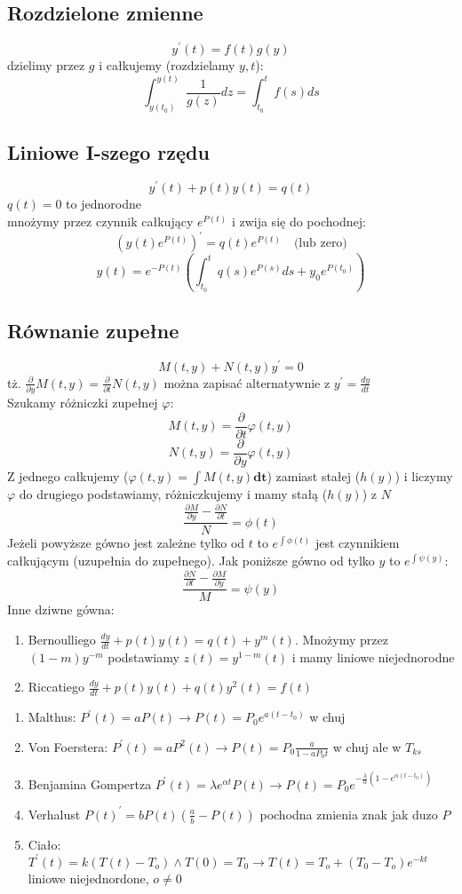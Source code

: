 \documentclass{article}
\begin{document}
\subsection*{Rozdzielone zmienne}
$$
y^\prime(t) = f(t)g(y)
$$
dzielimy przez $g$ i całkujemy (rozdzielamy $y,t$):
$$
\int_{y(t_0)}^{y(t)}\frac{1}{g(z)}dz = \int_{t_0}^t f(s)ds
$$
\subsection*{Liniowe I-szego rzędu}
$$
y^\prime(t) + p(t)y(t) = q(t)
$$
$q(t) = 0$ to jednorodne\\
mnożymy przez czynnik całkujący $e^{P(t)}$ i zwija się do pochodnej:
$$
\left( y(t)e^{P(t)}\right)^\prime = q(t)e^{P(t)} \quad \text{(lub zero)}
$$
$$
y(t) = e^{-P(t)} \left (\int_{t_0}^t q(s)e^{P(s)}ds + y_0e^{P(t_0)}\right)
$$
\subsection*{Równanie zupełne}
$$
M(t,y) + N(t,y)y^\prime = 0
$$
tż. $\frac{\partial}{\partial y}M(t,y) = \frac{\partial}{\partial t} N(t,y)$ można zapisać alternatywnie z $y^\prime = \frac{dy}{dt}$\\
Szukamy różniczki zupełnej $\varphi$:
$$M(t,y) = \frac{\partial}{\partial t} \varphi(t,y)$$
$$N(t,y) = \frac{\partial}{\partial y} \varphi(t,y)$$
Z jednego całkujemy ($\varphi(t,y) = \int M(t,y)\textbf{dt}$) zamiast stałej ($h(y)$) i liczymy $\varphi$ do drugiego podstawiamy, różniczkujemy i mamy stałą  ($h(y)$) z $N$
$$\frac{\frac{\partial M}{\partial y} - \frac{\partial N}{\partial t}}{N} = \phi(t)$$
Jeżeli powyższe gówno jest zależne tylko od $t$ to $e^{\int \phi(t)}$ jest czynnikiem całkującym (uzupełnia do zupełnego). Jak poniższe gówno od tylko $y$ to $e^{\int \psi(y)}$:
$$\frac{\frac{\partial N}{\partial t} - \frac{\partial M}{\partial y}}{M} = \psi(y)$$
Inne dziwne gówna:
\begin{enumerate}
\item Bernoulliego $\frac{dy}{dt} + p(t)y(t) = q(t)+y^m(t)$. 
Mnożymy przez $(1-m)y^{-m}$ podstawiamy $z(t) = y^{1-m}(t)$ i mamy liniowe niejednorodne
\item Riccatiego $\frac{dy}{dt} + p(t)y(t) + q(t)y^2(t) = f(t)$
\end{enumerate}
\clearpage
\begin{enumerate}
    \item Malthus: $P^\prime(t) = aP(t) \rightarrow P(t)=P_0e^{a(t-t_0)}$ w chuj 
    \item Von Foerstera: $P^\prime(t) = aP^2(t) \rightarrow P(t)=P_0\frac{a}{1-aP_0t}$ w chuj ale w $T_{ks}$
    \item Benjamina Gompertza $P^\prime(t) = \lambda e^{\alpha t}P(t) \rightarrow P(t)=P_0e^{-\frac{\lambda}{\alpha}(1-e^{\alpha(t-t_0)})}$
    \item Verhalust $P(t)^\prime = bP(t)\left(\frac{a}{b} - P(t)\right)$ pochodna zmienia znak jak duzo $P$
    \item Ciało: $T^\prime(t) = k(T(t) - T_o) \land T(0) = T_0 \rightarrow T(t) = T_o + (T_0-T_o)e^{-kt}$ liniowe niejednordone, $o \neq 0$
\end{enumerate}
\end{document}
